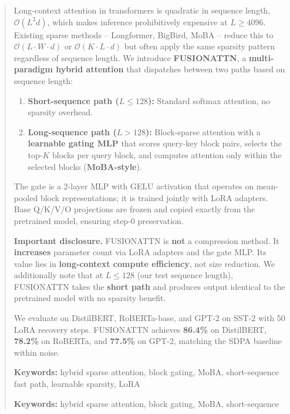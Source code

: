 \documentclass{article}
\begin{document}
\maketitle

\begin{abstract}
Long-context attention in transformers is quadratic in sequence length, 
$\mathcal{O}(L^2 d)$, which makes inference prohibitively expensive at 
$L \geq 4096$. Existing sparse methods -- Longformer, BigBird, MoBA -- reduce 
this to $\mathcal{O}(L \cdot W \cdot d)$ or $\mathcal{O}(K \cdot L \cdot d)$ 
but often apply the same sparsity pattern regardless of sequence length. 
We introduce \textbf{FUSIONATTN}, a \textbf{multi-paradigm hybrid attention} that 
dispatches between two paths based on sequence length:

\begin{enumerate}
\item \textbf{Short-sequence path ($L \leq 128$):} Standard softmax attention, no
  sparsity overhead.
\item \textbf{Long-sequence path ($L > 128$):} Block-sparse attention with a
  \textbf{learnable gating MLP} that scores query-key block pairs, selects the
  top-$K$ blocks per query block, and computes attention only within the
  selected blocks (\textbf{MoBA-style}).

\end{enumerate}
The gate is a 2-layer MLP with GELU activation that operates on 
mean-pooled block representations; it is trained jointly with LoRA 
adapters. Base Q/K/V/O projections are frozen and copied exactly from the 
pretrained model, ensuring step-0 preservation.

\textbf{Important disclosure.} FUSIONATTN is \textbf{not} a compression method. It 
\textbf{increases} parameter count via LoRA adapters and the gate MLP. Its value 
lies in \textbf{long-context compute efficiency}, not size reduction. We 
additionally note that at $L \leq 128$ (our test sequence length), FUSIONATTN 
takes the \textbf{short path} and produces output identical to the pretrained 
model with no sparsity benefit.

We evaluate on DistilBERT, RoBERTa-base, and GPT-2 on SST-2 with 
50 LoRA recovery steps. FUSIONATTN achieves 
\textbf{86.4\%} on DistilBERT, \textbf{78.2\%} on RoBERTa, and \textbf{77.5\%} 
on GPT-2, matching the SDPA baseline within noise.

\textbf{Keywords:} hybrid sparse attention, block gating, MoBA, short-sequence 
fast path, learnable sparsity, LoRA



\vspace{0.5em}
\noindent\textbf{Keywords:} hybrid sparse attention, block gating, MoBA, short-sequence
\end{abstract}
\end{document}
